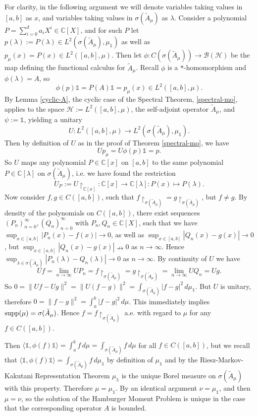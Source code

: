 \documentclass[12pt,oneside]{report}
\begin{document}
For clarity, in the following argument we will denote variables taking values in $[a,b]$ as $x$, and variables taking values in $\sigma(\tilde{A}_{\mu})$ as $\lambda$.
Consider a polynomial $P = \sum_{i=0}^{d}a_{i}X^{i} \in \mathbb{C}[X]$, and for such $P$ let $p(\lambda) := P(\lambda) \in L^{2}(\sigma(\tilde{A}_{\mu}), \mu_{\mathds{1}})$ as well as $p_{\mu}(x) = P(x) \in L^{2}([a,b],\mu)$.
Then let $\phi: C(\sigma(\tilde{A}_\mu)) \to \mathscr{B}(\mathscr{H})$ be the map defining the functional calculus for $\tilde{A}_{\mu}$. Recall $\phi$ is a $*$-homomorphism and $\phi(\lambda) = A$, so
$$\phi(p)\mathds{1} = P(A)\mathds{1} = p_{\mu}(x) \in L^{2}([a,b], \mu).$$
By Lemma \ref{cyclic-A}, the cyclic case of the Spectral Theorem, \ref{spectral-mo}, applies to the space $\mathscr{H} := L^{2}([a,b],\mu)$, the self-adjoint operator $\tilde{A}_{\mu}$, and $\psi := \mathds{1}$, yielding a unitary
$$U: L^{2}([a,b],\mu) \to L^{2}(\sigma(\tilde{A}_{\mu}),\mu_{\mathds{1}}).$$
Then by definition of $U$ as in the proof of Theorem \ref{spectral-mo}, we have
$$Up_{\mu} = U\phi(p)\mathds{1} = p.$$
So $U$ maps any polynomial $P \in \mathbb{C}[x]$ on $[a,b]$ to the same polynomial $P \in \mathbb{C}[\lambda]$ on $\sigma(\tilde{A}_{\mu})$, i.e. we have found the restriction
$$U_{P} := U \restriction_{\mathbb{C}[x]}: \mathbb{C}[x] \to \mathbb{C}[\lambda]: P(x) \mapsto P(\lambda).$$
Now consider $f,g \in C([a,b])$, such that $f \restriction_{\sigma(\tilde{A}_\mu)} = g \restriction_{\sigma(\tilde{A}_\mu)}$, but $f \neq g$. By density of the polynomials on $C([a,b])$, there exist sequences $(P_n)_{n=0}^\infty, (Q_n)_{n=0}^\infty$ with $P_n, Q_n \in \mathbb{C}[X]$, such that we have $\sup_{x \in [a,b]}|P_n(x) - f(x)| \to 0$, as well as $\sup_{x \in [a,b]}|Q_n(x) - g(x)| \to 0$, but $\sup_{x \in [a,b]}|Q_n(x) - g(x)| \nrightarrow 0$ as $n \to \infty$. Hence $\sup_{\lambda \in \sigma(\tilde{A}_\mu)}|P_n(\lambda) - Q_n(\lambda)| \to 0$ as $n \to \infty$. By continuity of $U$ we have
$$Uf = \lim_{n \to \infty} UP_n = f \restriction_{\sigma(\tilde{A}_\mu)} = g \restriction_{\sigma(\tilde{A}_\mu)} = \lim_{n \to \infty} UQ_n = Ug.$$
So $0 = \|Uf - Ug\|^2 = \|U(f-g)\|^2 = \int_{\sigma(\tilde{A}_\mu)} |f - g|^2 \, d\mu_\mathds{1}$.
But $U$ is unitary, therefore $0 = \|f-g\|^2 = \int_a^b |f - g|^2 \, d\mu$.
This immediately implies $\mathrm{supp}(\mu) = \sigma(\tilde{A}_\mu)$.
Hence $f = f \restriction_{\sigma(\tilde{A}_{\mu})}$ a.e. with regard to $\mu$ for any $f \in C([a,b])$.

Then $\langle \mathds{1}, \phi(f)\mathds{1} \rangle = \int _{a}^{b} f \, d\mu = \int _{\sigma(\tilde{A}_{\mu})} f \, d\mu$ for all $f \in C([a,b])$, but we recall that $\langle \mathds{1}, \phi(f)\mathds{1} \rangle = \int _{\sigma(\tilde{A}_{\mu})} f \, d\mu_{\mathds{1}}$ by definition of $\mu_{\mathds{1}}$ and by the Riesz-Markov-Kakutani Representation Theorem $\mu_{\mathds{1}}$ is the unique Borel measure on $\sigma(\tilde{A}_{\mu})$ with this property. Therefore $\mu = \mu_\mathds{1}$. By an identical argument $\nu = \mu_\mathds{1}$, and then $\mu = \nu$, so the solution of the Hamburger Moment Problem is unique in the case that the corresponding operator $A$ is bounded.
\end{document}
